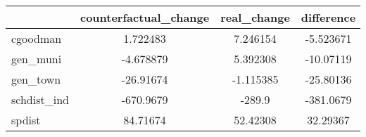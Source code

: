 {
\def\sym#1{\ifmmode^{#1}\else\(^{#1}\)\fi}
\begin{tabular}{l*{1}{ccc}}
\toprule
                              &counterfactual\_change& real\_change&  difference\\
\midrule
cgoodman                      &    1.722483&    7.246154&   -5.523671\\
gen\_muni                      &   -4.678879&    5.392308&   -10.07119\\
gen\_town                      &   -26.91674&   -1.115385&   -25.80136\\
schdist\_ind                   &   -670.9679&      -289.9&   -381.0679\\
spdist                        &    84.71674&    52.42308&    32.29367\\
\bottomrule
\end{tabular}
}
